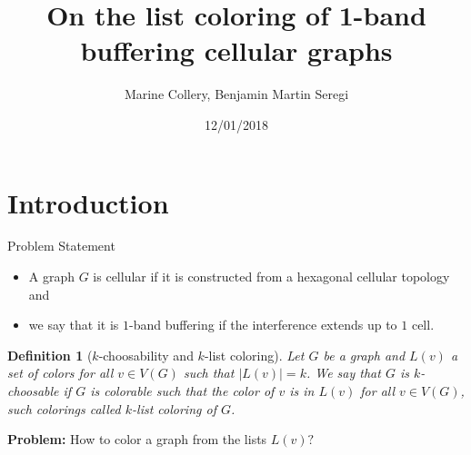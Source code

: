 \documentclass{beamer}
\title[Final Seminar]{On the list coloring of 1-band buffering cellular graphs}
\author{Marine Collery, Benjamin Martin Seregi}
\institute{KTH Royal Institute of Technology\\
II2202, Fall 2017, Period 1-2}
\date{12/01/2018}
\newtheorem{defi}[lem]{Definition}
\begin{document}
\begin{frame}
  \titlepage
\end{frame}

\section{Introduction}

\begin{frame}{Problem Statement}

\justifying
\begin{itemize}
\item A graph $G$ is cellular if it is constructed from a hexagonal cellular topology and
\pause \item we say that it is $1$-band buffering if the interference extends up to $1$ cell.
\end{itemize}
\pause \begin{defi}[$k$-choosability and $k$-list coloring]
Let $G$ be a graph and $L(v)$ a set of colors for all $v \in V(G)$ such that $|L(v)|=k$. We say that $G$ is $k$\textit{-choosable} if $G$ is colorable such that the color of $v$ is in $L(v)$ for all $v \in V(G)$, such colorings called $k$\textit{-list coloring} of $G$.
\pause
\end{defi}
\textbf{Problem:} How to color a graph from the lists $L(v)?$
\end{frame}
\end{document}
